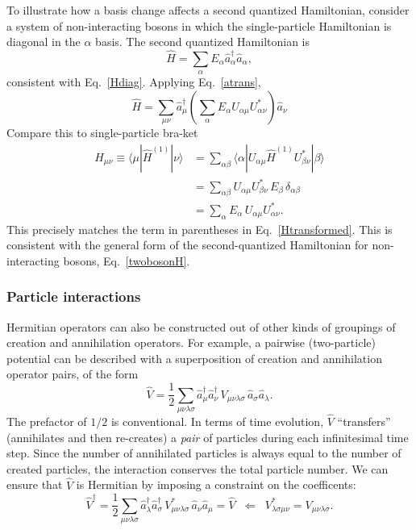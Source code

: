 \documentclass[pra,12pt]{revtex4}
\begin{document}
To illustrate how a basis change affects a second quantized
Hamiltonian, consider a system of non-interacting bosons in which the
single-particle Hamiltonian is diagonal in the $\alpha$ basis.  The
second quantized Hamiltonian is
\begin{equation}
  \hat{H} = \sum_\alpha E_\alpha \hat{a}_\alpha^\dagger \hat{a}_\alpha,
\end{equation}
consistent with Eq.~\eqref{Hdiag}.  Applying Eq.~\eqref{atrans},
\begin{equation}
  \hat{H} = \sum_{\mu\nu} \hat{a}_\mu^\dagger
  \left(\sum_\alpha E_\alpha U_{\alpha\mu} U_{\alpha\nu}^*\right)
  \hat{a}_\nu
  \label{Htransformed}
\end{equation}
Compare this to single-particle bra-ket
\begin{align}
  H_{\mu\nu} \equiv \langle\mu | \hat{H}^{(1)} | \nu\rangle
  &= \sum_{\alpha\beta} \langle \alpha | U_{\alpha\mu} \hat{H}^{(1)} U_{\beta\nu}^* |\beta\rangle \\
  &= \sum_{\alpha\beta} U_{\alpha\mu} U_{\beta\nu}^* \, E_\beta \, \delta_{\alpha\beta} \\
  &= \sum_{\alpha} E_\alpha\, U_{\alpha\mu} U_{\alpha\nu}^*.
\end{align}
This precisely matches the term in parentheses in
Eq.~\eqref{Htransformed}.  This is consistent with the general form of
the second-quantized Hamiltonian for non-interacting bosons,
Eq.~\eqref{twobosonH}.


\subsubsection{Particle interactions}

Hermitian operators can also be constructed out of other kinds of
groupings of creation and annihilation operators.  For example, a
pairwise (two-particle) potential can be described with a
superposition of creation and annihilation operator pairs, of the form
\begin{equation}
  \hat{V} = \frac{1}{2}
  \sum_{\mu\nu\lambda\sigma} \hat{a}^\dagger_\mu \hat{a}^\dagger_\nu \,
  V_{\mu\nu\lambda\sigma}\, \hat{a}_\sigma \hat{a}_\lambda.
  \label{Vop}
\end{equation}
The prefactor of $1/2$ is conventional.  In terms of time evolution,
$\hat{V}$ ``transfers'' (annihilates and then re-creates) a
\textit{pair} of particles during each infinitesimal time step.  Since
the number of annihilated particles is always equal to the number of
created particles, the interaction conserves the total particle
number.  We can ensure that $\hat{V}$ is Hermitian by imposing a
constraint on the coefficents:
\begin{equation}
  \hat{V}^\dagger = \frac{1}{2}
  \sum_{\mu\nu\lambda\sigma} \hat{a}^\dagger_\lambda \hat{a}^\dagger_\sigma
  \, V_{\mu\nu\lambda\sigma}^* \, \hat{a}_\nu \hat{a}_\mu = \hat{V}
  \;\;\Leftarrow \;\;
  V_{\lambda\sigma\mu \nu}^* = V_{\mu\nu\lambda\sigma}.
\end{equation}
\end{document}
